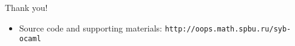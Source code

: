 \begin{frame}{Thank you!}
\begin{itemize}
\item Source code and supporting materials: \texttt{http://oops.math.spbu.ru/syb-ocaml}
\end{itemize}
\end{frame}



